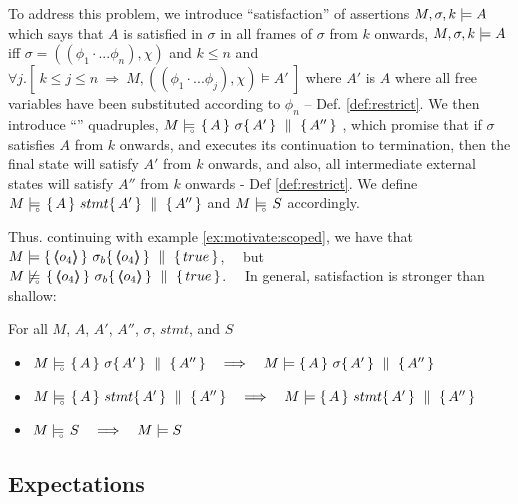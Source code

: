 To address this problem, we introduce ``\scoped satisfaction'' of assertions $ M,\sigma ,{k} \models {A} $ which says that $A$ is satisfied in $\sigma$  in all frames of $\sigma$ from $k$ onwards, 
\ie  $ M,\sigma ,{k} \models {A} $ iff $\sigma = ((\phi_1\cdot ... \phi_n), \chi)$ and $k\leq n$ and $\forall j. [\  k\leq j \leq n \ \Rightarrow \ M, ((\phi_1\cdot ... \phi_j), \chi) \models A'\ ]$ where $A'$ is $A$ where all free variables have been substituted according to $\phi_n$ -- \cf Def. \ref{def:restrict}.
We then introduce ``\scoped'' quadruples,   $M \models\!\!\!\!_{_{\circ}}\   \{\, A \, \}\ \sigma \{\, A' \, \} \, \,\parallel\,\, \{\, A'' \, \} $ , which promise that if $\sigma$ satisfies $A$ from $k$ onwards, and executes its continuation to termination, then the final state will satisfy $A'$ from $k$ onwards, and also, all intermediate external states will satisfy $A''$ from $k$ onwards - \cf Def \ref{def:restrict}.
We define   $M \models\!\!\!\!_{_{\circ}}\   \{\, A \, \}\ stmt \{\, A' \, \} \, \,\parallel\,\, \{\, A'' \, \}  $ and  $M \models\!\!\!\!_{_{\circ}}\  S $ accordingly.


Thus. continuing with example \ref{ex:motivate:scoped},  we have that\ \  $\satisfies {M} {\quadruple   {\inside {o_4}} }   {\sigma_b}   {\inside {o_4}}  {true} $, \ \ 
 but \\ $\notSatisfiesD {M}   {\quadruple   {\inside {o_4}} }  {\sigma_b}   {\inside {o_4}}  {true}  $.
\ \  In general, \scoped satisfaction is stronger than shallow:   
 
\begin{lemma}
For all $M$, $A$, $A'$, $A''$, $\sigma$, $stmt$, and $S$
\begin{itemize}
\item
 $M \models\!\!\!\!_{_{\circ}}\   \{\, A \, \}\ \sigma \{\, A' \, \} \, \,\parallel\,\, \{\, A'' \, \}    \ \ \ \Longrightarrow \ \ \   M \models  \{\, A \, \}\ \sigma \{\, A' \, \} \, \,\parallel\,\, \{\, A'' \, \} $

\item
 $M \models\!\!\!\!_{_{\circ}}\   \{\, A \, \}\ stmt \{\, A' \, \} \, \,\parallel\,\, \{\, A'' \, \}    \ \ \ \Longrightarrow \ \ \   M \models  \{\, A \, \}\ stmt \{\, A' \, \} \, \,\parallel\,\, \{\, A'' \, \} $
\item 
$\satisfiesD {M} {S}  \ \ \ \Longrightarrow \ \ \ \satisfies {M} {S}$
\end{itemize}
\end{lemma}



 \subsection{Expectations}

